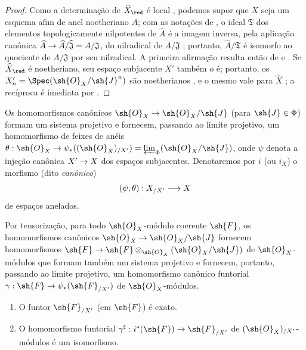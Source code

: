 \documentclass[oneside]{amsart}
\makeatletter
\newcommand{\ega@arrow}[2]{\mathchoice{#1}{#2}{#2}{#2}}
\renewcommand{\to}{\ega@arrow{\longrightarrow}{\rightarrow}}
\newcommand{\oldpage}[2][]{{\marginnote{\normalfont\textbf{#1}~|~#2}}\ignorespaces}
\let\EGAOriginalLabel\label
\renewcommand{\label}[1]{\phantomsection\EGAOriginalLabel{#1}}
\makeatother
\begin{document}
\oldpage[I]{196}

\begin{proof}
Como a determinação de $\widehat{X}_\red$ é local , podemos supor que $X$ seja um esquema afim de anel noetheriano $A$; com as notações de , o ideal $\mathfrak{T}$ dos elementos topologicamente nilpotentes de $\widehat{A}$ é a imagem inversa, pela aplicação canônica $\widehat{A}\to\widehat{A}/\widehat{\mathfrak{J}}=A/\mathfrak{J}$, do nilradical de $A/\mathfrak{J}$ ; portanto, $\widehat{A}/\mathfrak{T}$ é isomorfo ao quociente de $A/\mathfrak{J}$ por seu nilradical.
A primeira afirmação resulta então de  e .
Se $\widehat{X}_\red$ é noetheriano, seu espaço subjacente $X'$ também o é; portanto, os $X_n'=\Spec(\sh{O}_X/\sh{J}^n)$ são noetherianos , e o mesmo vale para $\widehat{X}$ ; a recíproca é imediata por .
\end{proof}

\begin{env}[10.8.7]
\label{I.10.8.7}
Os homomorfismos canônicos $\sh{O}_X\to\sh{O}_X/\sh{J}$ (para $\sh{J}\in\Phi$) formam um sistema projetivo e fornecem, passando ao limite projetivo, um homomorfismo de feixes de anéis $\theta:\sh{O}_X\to\psi_*((\sh{O}_X)_{/X'})=\varprojlim_\Phi(\sh{O}_X/\sh{J})$, onde $\psi$ denota a injeção canônica $X'\to X$ dos espaços subjacentes.
Denotaremos por $i$ (ou $i_X$) o morfismo (dito \emph{canônico})
\[
  (\psi,\theta):X_{/X'}\to X
\]
de espaços anelados.

Por tensorização, para todo $\sh{O}_X$-módulo coerente $\sh{F}$, os homomorfismos canônicos $\sh{O}_X\to\sh{O}_X/\sh{J}$ fornecem homomorfismos $\sh{F}\to\sh{F}\otimes_{\sh{O}_X}(\sh{O}_X/\sh{J})$ de $\sh{O}_X$-módulos que formam também um sistema projetivo e fornecem, portanto, passando ao limite projetivo, um homomorfismo canônico funtorial $\gamma:\sh{F}\to\psi_*(\sh{F}_{/X'})$ de $\sh{O}_X$-módulos.
\end{env}

\begin{proposition}[10.8.8]
\label{I.10.8.8}
\medskip\noindent
\begin{enumerate}
  \item[\rm{(i)}] O funtor $\sh{F}_{/X'}$ (em $\sh{F}$) é exato.
  \item[\rm{(ii)}] O homomorfismo funtorial $\gamma^\sharp:i^*(\sh{F})\to\sh{F}_{/X'}$ de $(\sh{O}_X)_{/X'}$-módulos é um isomorfismo.
\end{enumerate}
\end{proposition}
\end{document}
